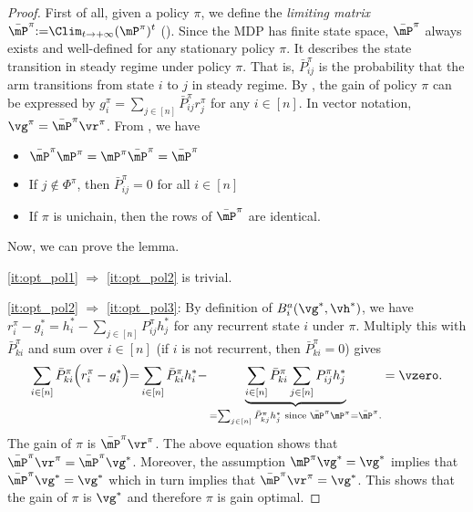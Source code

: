 \begin{proof}
    First of all, given a policy $\pi$, we define the \emph{limiting matrix} $\bar{\mP}^\pi{:=}\displaystyle\Clim_{t\to+\infty}{(\mP^\pi)^t}$ (\cite[Appendix~A.4]{puterman2014markov}). %
    Since the MDP has finite state space, $\bar{\mP}^\pi$ always exists and well-defined for any stationary policy $\pi$.
    It describes the state transition in steady regime under policy $\pi$.
    That is, $\bar{P}^\pi_{ij}$ is the probability that the arm transitions from state $i$ to $j$ in steady regime.
    By \cite[Theorem~8.2.6]{puterman2014markov}, the gain of policy $\pi$ can be expressed by $g^\pi_i=\sum_{j\in[n]}\bar{P}^\pi_{ij}r^{\pi}_j$ for any $i\in[n]$.
    In vector notation, $\vg^\pi=\bar{\mP}^\pi\vr^\pi$.
    From \cite[Section~A.4]{puterman2014markov}, we have
    \begin{itemize}
        \item $\bar{\mP}^\pi\mP^\pi =\mP^\pi\bar{\mP}^\pi =\bar{\mP}^\pi$
        \item If $j\notin\Phi^\pi$, then $\bar{P}^\pi_{ij}=0$ for all $i\in[n]$
        \item If $\pi$ is unichain, then the rows of $\bar{\mP}^\pi$ are identical.
    \end{itemize}
    Now, we can prove the lemma.

    \ref{it:opt_pol1} $\Rightarrow$ \ref{it:opt_pol2} is trivial.

    \ref{it:opt_pol2} $\Rightarrow$ \ref{it:opt_pol3}: By definition of $B_i^a(\vg^*,\vh^*)$, we have $r^{\pi}_i-g^*_i = h^*_i-\sum_{j\in[n]} P^{\pi}_{ij}h^*_j$ for any recurrent state $i$ under $\pi$.
    Multiply this with $\bar{P}^\pi_{ki}$ and sum over $i\in[n]$ (if $i$ is not recurrent, then $\bar{P}^\pi_{ki}=0$) gives
    \begin{align*}
        \sum_{i\in[n]} \bar{P}^\pi_{ki}\Big(r^{\pi}_i-g^*_i\Big) {=} \sum_{i\in[n]} \bar{P}^\pi_{ki}h^*_i {-} \underbrace{\sum_{i\in[n]} \bar{P}^\pi_{ki}\sum_{j\in[n]} P^{\pi}_{ij}h^*_j}_{=\sum_{j\in[n]} \bar{P}^\pi_{kj}h^*_j \text{ since $\bar{\mP}^\pi\mP^\pi{=}\bar{\mP}^\pi$.}}
        = \vzero.
    \end{align*}
    The gain of $\pi$ is $\bar{\mP}^\pi \vr^\pi$.
    The above equation shows that $\bar{\mP}^\pi\vr^\pi = \bar{\mP}^\pi\vg^*$. Moreover, the assumption  $\mP^\pi\vg^*=\vg^*$ implies that $\bar{\mP}^\pi\vg^*=\vg^*$ which in turn implies that $\bar{\mP}^\pi\vr^\pi=\vg^*$. This shows that the gain of $\pi$ is $\vg^*$ and therefore $\pi$ is gain optimal.


\end{proof}
